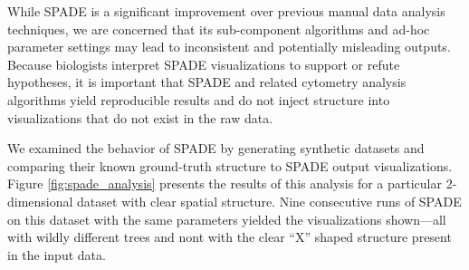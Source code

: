 \documentclass{article}
\begin{document}

While SPADE is a significant improvement over previous manual data analysis techniques, 
we are concerned that its  sub-component algorithms and ad-hoc parameter settings may lead to inconsistent and potentially misleading outputs.  Because biologists interpret SPADE visualizations to support or refute hypotheses, it is important that SPADE and related cytometry analysis algorithms  yield reproducible results and do not  inject structure into visualizations that do not exist in the raw data. 

We examined the behavior of SPADE by generating synthetic datasets and comparing their known ground-truth structure to SPADE output visualizations.  Figure \ref{fig:spade_analysis} presents the results of this analysis for a particular 2-dimensional dataset with clear spatial structure.  Nine consecutive runs of SPADE on this dataset with the same parameters yielded the visualizations shown---all with wildly different trees and nont with the clear ``X'' shaped structure present in the input data.  %
 


\end{document}
